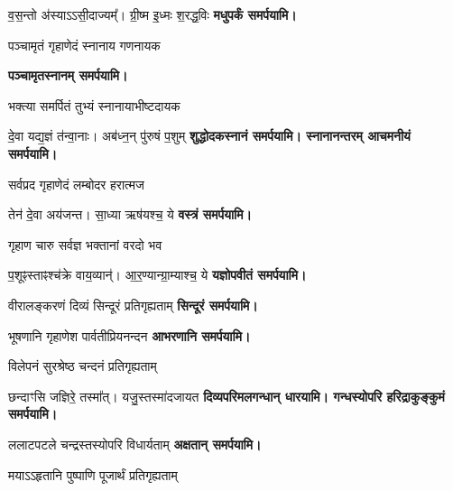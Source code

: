 \begin{center}
{व॒स॒न्तो अ॑स्याऽऽसी॒दाज्यम्᳚। ग्री॒ष्म इ॒ध्मः श॒रद्ध॒विः}
\textbf{\devAya{} मधुपर्कं समर्पयामि।}
\medskip

{पञ्चामृतं गृहाणेदं स्नानाय गणनायक}

\textbf{\devAya{} पञ्चामृतस्नानम् समर्पयामि।}
\medskip

{भक्त्या समर्पितं तुभ्यं स्नानायाभीष्टदायक}

{दे॒वा यद्य॒ज्ञं त॑न्वा॒नाः। अब॑ध्न॒न् पु॑रुषं प॒शुम्}
\textbf{\devAya{} शुद्धोदकस्नानं समर्पयामि। स्नानानन्तरम् आचमनीयं समर्पयामि।}
\medskip

{सर्वप्रद गृहाणेदं लम्बोदर हरात्मज}

{तेन॑ दे॒वा अय॑जन्त। सा॒ध्या ऋष॑यश्च॒ ये}
\textbf{\devAya{} वस्त्रं समर्पयामि।}
\medskip

{गृहाण चारु सर्वज्ञ भक्तानां वरदो भव}

{प॒शूꣴस्ताꣴश्च॑क्रे वाय॒व्यान्॑। आ॒र॒ण्यान्ग्रा॒म्याश्च॒ ये}
\textbf{\devAya{} यज्ञोपवीतं समर्पयामि।}
\medskip

{वीरालङ्करणं दिव्यं सिन्दूरं प्रतिगृह्यताम्}
\textbf{\devAya{} सिन्दूरं समर्पयामि।}
\medskip

{भूषणानि गृहाणेश पार्वतीप्रियनन्दन}
\textbf{\devAya{} आभरणानि समर्पयामि।}
\medskip

{विलेपनं सुरश्रेष्ठ चन्दनं प्रतिगृह्यताम्}

{छन्दाꣳसि जज्ञिरे॒ तस्मा᳚त्। यजु॒स्तस्मा॑दजायत}
\textbf{\devAya{} दिव्यपरिमलगन्धान् धारयामि। गन्धस्योपरि हरिद्राकुङ्कुमं समर्पयामि।}
\medskip

{ललाटपटले चन्द्रस्तस्योपरि विधार्यताम्}
\textbf{\devAya{} अक्षतान् समर्पयामि।}
\medskip

{मयाऽऽहृतानि पुष्पाणि पूजार्थं प्रतिगृह्यताम्}


\end{center}
